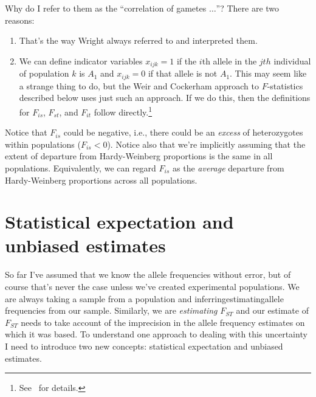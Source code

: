 Why do I refer to them as the ``correlation of gametes $\dots$''?
There are two reasons:

\begin{enumerate}

\item That's the way Wright always referred to and interpreted them.

\item We can define indicator variables $x_{ijk} = 1$ if the $i$th
  allele in the $jth$ individual of population $k$ is $A_1$ and
  $x_{ijk} = 0$ if that allele is not $A_1$. This may seem like a
  strange thing to do, but the Weir and Cockerham approach to
  $F$-statistics described below uses just such an approach. If we do
  this, then the definitions for $F_{is}$, $F_{st}$, and $F_{it}$
  follow directly.\footnote{See~\cite{Weir-1996} for details.}

\end{enumerate}

Notice that $F_{is}$ could be negative, i.e., there could be an {\it
  excess\/} of heterozygotes within populations ($F_{is} < 0$). Notice
also that we're implicitly assuming that the extent of departure from
Hardy-Weinberg proportions is the same in all
populations. Equivalently, we can regard $F_{is}$ as the {\it
  average\/} departure from Hardy-Weinberg proportions across all
populations.

\section*{Statistical expectation and unbiased
  estimates}

So far I've assumed that we know the allele frequencies without error,
but of course that's never the case unless we've created experimental
populations. We are always taking a sample from a population and
inferring{\dash}estimating{\dash}allele frequencies from our
sample. Similarly, we are {\it estimating\/} $F_{ST}$ and our estimate
of $F_{ST}$ needs to take account of the imprecision in the allele
frequency estimates on which it was based. To understand one approach
to dealing with this uncertainty I need to introduce two new concepts:
statistical expectation and unbiased
estimates.

